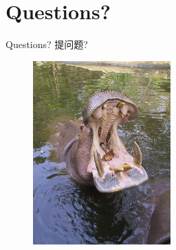 \section{Questions?}\label{questions}

\begin{frame}{Questions? 提问题?}

\begin{figure}[htbp]
\centering
\includegraphics{./img/img_0510_200.jpg}
\caption{}
\end{figure}

\end{frame}

